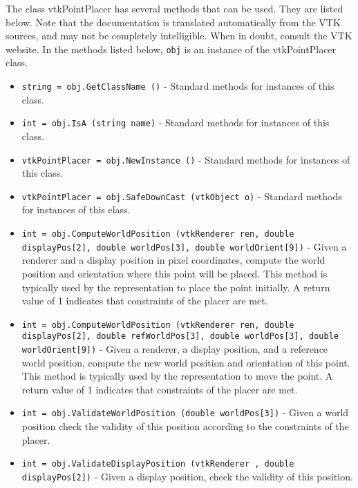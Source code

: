 The class vtkPointPlacer has several methods that can be used.
  They are listed below.
Note that the documentation is translated automatically from the VTK sources,
and may not be completely intelligible.  When in doubt, consult the VTK website.
In the methods listed below, \verb|obj| is an instance of the vtkPointPlacer class.
\begin{itemize}
\item  \verb|string = obj.GetClassName ()| -  Standard methods for instances of this class.

\item  \verb|int = obj.IsA (string name)| -  Standard methods for instances of this class.

\item  \verb|vtkPointPlacer = obj.NewInstance ()| -  Standard methods for instances of this class.

\item  \verb|vtkPointPlacer = obj.SafeDownCast (vtkObject o)| -  Standard methods for instances of this class.

\item  \verb|int = obj.ComputeWorldPosition (vtkRenderer ren, double displayPos[2], double worldPos[3], double worldOrient[9])| -  Given a renderer and a display position in pixel coordinates,
 compute the world position and orientation where this point
 will be placed. This method is typically used by the
 representation to place the point initially. A return value of 1
 indicates that constraints of the placer are met.

\item  \verb|int = obj.ComputeWorldPosition (vtkRenderer ren, double displayPos[2], double refWorldPos[3], double worldPos[3], double worldOrient[9])| -  Given a renderer, a display position, and a reference world
 position, compute the new world position and orientation 
 of this point. This method is typically used by the 
 representation to move the point. A return value of 1 indicates that 
 constraints of the placer are met.

\item  \verb|int = obj.ValidateWorldPosition (double worldPos[3])| -  Given a world position check the validity of this 
 position according to the constraints of the placer.

\item  \verb|int = obj.ValidateDisplayPosition (vtkRenderer , double displayPos[2])| -  Given a display position, check the validity of this position.


\end{itemize}
